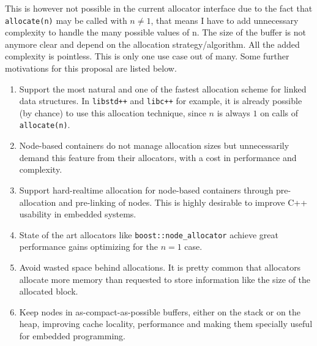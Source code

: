 \documentclass[11pt]{article}
\begin{document}
This is however not possible in the current allocator interface
due to the fact that \texttt{allocate(n)} may be called with $n \ne 1$,
that means I have to add unnecessary complexity to handle the many possible
values of n. The size of the buffer is not anymore clear and depend on the
allocation strategy/algorithm. All the added
complexity is pointless. This is only one use case out of many. Some
further motivations for this proposal are listed below.
\begin{enumerate}

\item Support the most natural and one of the fastest allocation
scheme for linked data structures. In \texttt{libstd++} and
\texttt{libc++} for example, it is already possible (by chance) to use
this allocation technique, since $n$ is always $1$ on calls of
\texttt{allocate(n)}.

\item Node-based containers do not manage allocation sizes but
unnecessarily demand this feature from their allocators, with a cost
in performance and complexity.


\item Support hard-realtime allocation for node-based containers
through pre-allocation and pre-linking of nodes. This is highly
desirable to improve C++ usability in embedded systems.

\item State of the art allocators like \texttt{boost::node\_allocator}
\cite{boost} achieve great performance gains optimizing for the $n = 1$ case. 

\item Avoid wasted space behind allocations. It is pretty common that
allocators allocate more memory than requested to store information
like the size of the allocated block.

\item Keep nodes in as-compact-as-possible buffers, either on the
stack or on the heap, improving cache locality, performance and making
them specially useful for embedded programming.

\end{enumerate}
\end{document}
